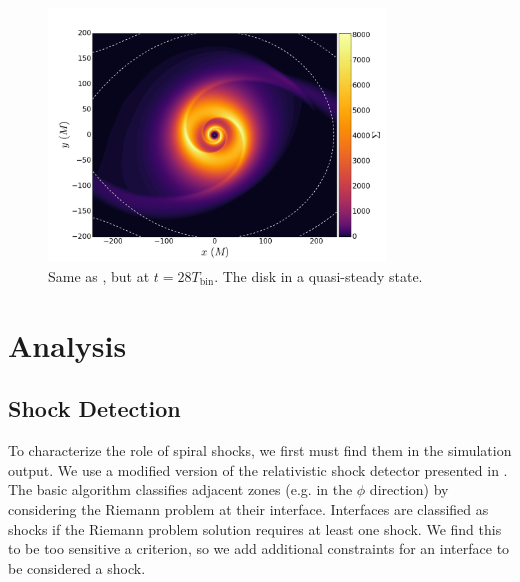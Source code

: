 \begin{figure}
\begin{center}
\includegraphics[width=0.8\textwidth]{figures/minidisk/q011_m3_sig_2800.pdf}
\end{center}
\caption{ Same as , but at $t = 28 T_\text{bin}$.  The disk in a quasi-steady state.}
\end{figure}



\section{Analysis}


\subsection{Shock Detection}

To characterize the role of spiral shocks, we first must find them in the simulation output.  We use a modified version of the relativistic shock detector presented in \cite{Zanotti10}.  The basic algorithm classifies adjacent zones (e.g. in the $\phi$ direction) by considering the Riemann problem at their interface.  Interfaces are classified as shocks if the Riemann problem solution requires at least one shock.  We find this to be too sensitive a criterion, so we add additional constraints for an interface to be considered a shock.

